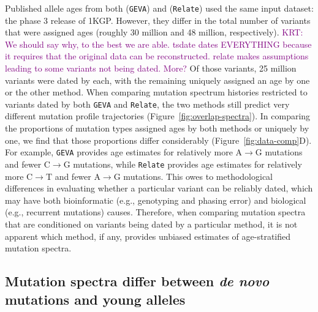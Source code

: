 \documentclass[]{article}
\newcommand{\krtcomment}[1]{{\textcolor{purple}{KRT: #1}}}
\newcommand{\GEVA}{\texttt{GEVA}\xspace}
\newcommand{\relate}{\texttt{Relate}\xspace}
\begin{document}
Published allele ages from both \citet{albers2020dating} (\GEVA) and
\citet{speidel2019method} (\relate) used the same input dataset: the phase 3
release of 1KGP. However, they differ in the total number of variants that were
assigned ages (roughly 30 million and 48 million, respectively).
\krtcomment{We should say why, to the best we are able. tsdate dates EVERYTHING
because it requires that the original data can be reconstructed. relate makes assumptions
leading to some variants not being dated.  More?} Of those
variants, 25 million variants were dated by each, with the remaining uniquely
assigned an age by one or the other method. When comparing mutation spectrum
histories restricted to variants dated by both \GEVA and \relate, the two
methods still predict very different mutation profile trajectories
(Figure~\ref{fig:overlap-spectra}). In comparing the proportions of mutation
types assigned ages by both methods or uniquely by one, we find that those
proportions differ considerably (Figure~\ref{fig:data-comp}D). For example,
\GEVA provides age estimates for relatively more A$\rightarrow$G mutations and
fewer C$\rightarrow$G mutations, while \relate provides age estimates for
relatively more C$\rightarrow$T and fewer A$\rightarrow$G mutations. This owes
to methodological differences in evaluating whether a particular variant can be
reliably dated, which may have both bioinformatic (e.g., genotyping and phasing
error) and biological (e.g., recurrent mutations) causes. Therefore, when
comparing mutation spectra that are conditioned on variants being dated by a
particular method, it is not apparent which method, if any, provides unbiased
estimates of age-stratified mutation spectra.

\subsection*{Mutation spectra differ between \emph{de novo} mutations and young
alleles}
\end{document}
